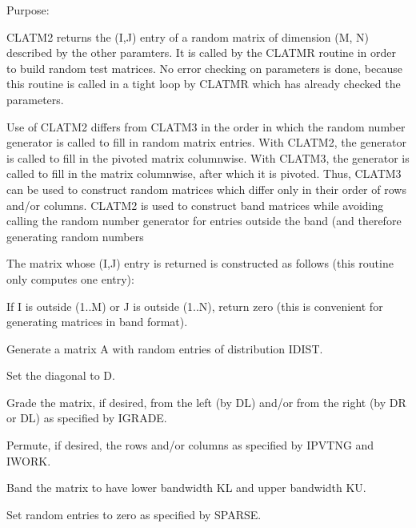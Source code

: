 \begin{DoxyParagraph}{Purpose\+: }
\begin{DoxyVerb}    CLATM2 returns the (I,J) entry of a random matrix of dimension
    (M, N) described by the other paramters. It is called by the
    CLATMR routine in order to build random test matrices. No error
    checking on parameters is done, because this routine is called in
    a tight loop by CLATMR which has already checked the parameters.

    Use of CLATM2 differs from CLATM3 in the order in which the random
    number generator is called to fill in random matrix entries.
    With CLATM2, the generator is called to fill in the pivoted matrix
    columnwise. With CLATM3, the generator is called to fill in the
    matrix columnwise, after which it is pivoted. Thus, CLATM3 can
    be used to construct random matrices which differ only in their
    order of rows and/or columns. CLATM2 is used to construct band
    matrices while avoiding calling the random number generator for
    entries outside the band (and therefore generating random numbers

    The matrix whose (I,J) entry is returned is constructed as
    follows (this routine only computes one entry):

      If I is outside (1..M) or J is outside (1..N), return zero
         (this is convenient for generating matrices in band format).

      Generate a matrix A with random entries of distribution IDIST.

      Set the diagonal to D.

      Grade the matrix, if desired, from the left (by DL) and/or
         from the right (by DR or DL) as specified by IGRADE.

      Permute, if desired, the rows and/or columns as specified by
         IPVTNG and IWORK.

      Band the matrix to have lower bandwidth KL and upper
         bandwidth KU.

      Set random entries to zero as specified by SPARSE.\end{DoxyVerb}
 
\end{DoxyParagraph}

